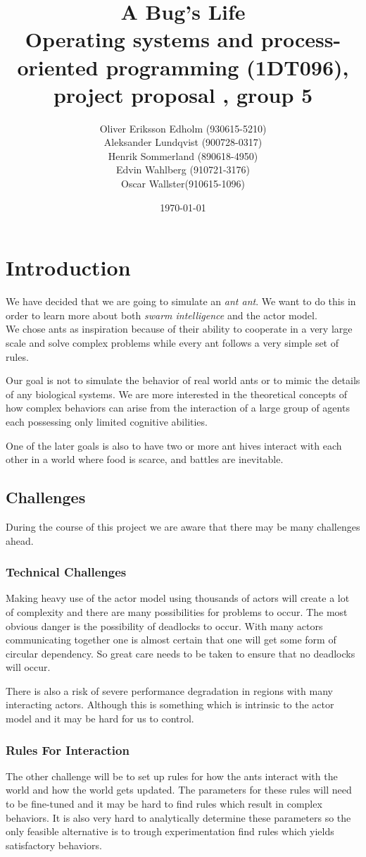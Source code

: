 \documentclass[a4paper]{article}
\title{A Bug's Life\\
 Operating systems and process-oriented programming (1DT096), project proposal
, group 5}
\date{\today}
\author{Oliver Eriksson Edholm (930615-5210) \\
Aleksander Lundqvist (900728-0317) \\
Henrik Sommerland (890618-4950) \\
Edvin Wahlberg (910721-3176) \\
Oscar Wallster(910615-1096)}
\begin{document}
\maketitle 

\section{Introduction}
We have decided that we are going to simulate an \emph{ant ant}. We want to do
this in order to learn more about both \emph{swarm intelligence} and the actor
model.\\
We chose ants as inspiration because of their ability to cooperate in a very large
scale and solve complex problems while every ant follows a very simple set of rules.


Our goal is not to simulate the behavior of real world ants or to mimic the
details of any biological systems.
We are more interested in the theoretical concepts of how complex behaviors can
arise from the interaction of a large group of agents each possessing only limited
cognitive abilities.


One of the later goals is also to have two or more ant hives interact with
each other in a world where food is scarce, and battles are inevitable.

\subsection{Challenges}
During the course of this project we are aware that there may be many challenges
ahead.

\subsubsection{Technical Challenges}
Making heavy use of the actor model using thousands of actors will create a lot
of complexity and there are many possibilities for problems to occur. The most
obvious danger is the possibility of deadlocks to occur. With many actors
communicating together one is almost certain that one will get some form of
circular dependency. So great care needs to be taken to ensure that no
deadlocks will occur.

There is also a risk of severe performance degradation in regions with many
interacting actors. Although this is something which is intrinsic to the actor
model and it may be hard for us to control.

\subsubsection{Rules For Interaction}
The other challenge will be to set up rules for how the ants interact with the
world and how the world gets updated. The parameters for these rules will need
to be fine-tuned and it may be hard to find rules which result in complex
behaviors. It is also very hard to analytically determine these parameters so
the only feasible alternative is to trough experimentation find rules which
yields satisfactory behaviors.
\end{document}
